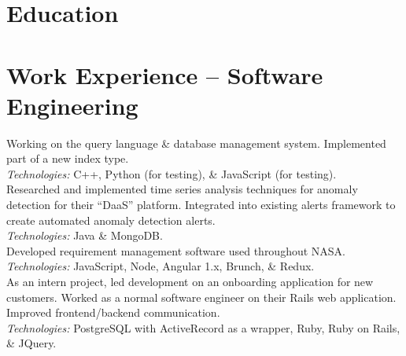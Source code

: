 \documentclass[11pt,letter,sans]{moderncv}
\begin{document}
\makecvtitle
\vspace{-40pt}
\section{Education}


\section{Work Experience -- Software Engineering}
Working on the query language \& database management system.
Implemented part of a new index type.
\\
\textit{Technologies:} C++, Python (for testing), \& JavaScript (for testing).
\\
Researched and implemented time series analysis techniques for anomaly detection for their ``DaaS'' platform. Integrated into existing alerts framework to create automated anomaly detection alerts.
\\
\textit{Technologies:} Java \& MongoDB.
\\
Developed requirement management software used throughout NASA.
\\
\textit{Technologies:} JavaScript, Node, Angular 1.x, Brunch, \& Redux.
\\
As an intern project, led development on an onboarding application for new customers.
Worked as a normal software engineer on their Rails web application.
Improved frontend/backend communication.
\\
\textit{Technologies:} PostgreSQL with ActiveRecord as a wrapper, Ruby, Ruby on Rails, \& JQuery.
\end{document}
